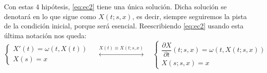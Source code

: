 Con estas 4 hipótesis, \eqref{eq:ec2} tiene una única solución. Dicha solución se denotará en lo que sigue como $X(t;s,x)$, es decir,
siempre seguiremos la pista de la condición inicial, porque será esencial. Reescribiendo \eqref{eq:ec2} usando esta última notación nos queda:
\begin{equation}\label{eq:ec32}
    \left\{
    \begin{array}{l}
    X'(t)=\omega(t,X(t))\\[6pt]
    X(s)=x
    \end{array}
    \right.
    \quad
    \overset{X(t)\equiv X(t;s,x)}{\longleftrightarrow}
    \quad
    \left\{
    \begin{array}{l}
    \dfrac{\partial X}{\partial t}(t;s,x)
    =\omega(t,X(t;s,x))\\[6pt]
    X(s;s,x)=x
    \end{array}
    \right.
\end{equation}

